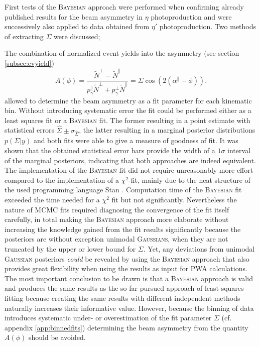 First tests of the \textsc{Bayesian} approach were performed when confirming already published results for the beam asymmetry in $\eta$ photoproduction \cite{farahphd,eta} and were successively also applied to data obtained from $\eta'$ photoproduction. Two methods of extracting $\Sigma$ were discussed;

The combination of normalized event yields into the asymmetry (see section \ref{subsec:evyield})
	\begin{equation}
		A(\phi)=\frac{\tilde{N}^\bot-\tilde{N}^\parallel}{p_\gamma^\parallel\tilde{N}^\bot+p_\gamma^\bot\tilde{N}^\parallel}=\Sigma\cos\left(2\left(\alpha^\parallel-\phi\right)\right).
	\end{equation} 
allowed to determine the beam asymmetry as a fit parameter for each kinematic bin. Without introducing systematic error the fit could be performed either as a least squares fit or a \textsc{Bayesian} fit. The former resulting in a point estimate with statistical errors $\hat{\Sigma}\pm\sigma_{\hat{\Sigma}}$, the latter resulting in a marginal posterior distributions $p\left(\Sigma|y\right)$ and both fits were able to give a measure of goodness of fit. It was shown that the obtained statistical error bars provide the width of a $1\sigma$ interval of the 
marginal posteriors, indicating that both approaches are indeed equivalent. The implementation of the \textsc{Bayesian} fit did not require unreasonably more effort compared to the implementation of a $\chi^2$-fit, mainly due to the neat structure of the used programming language Stan \cite{stan}. Computation time of the \textsc{Bayesian} fit exceeded the time needed for a $\chi^2$ fit but not significantly. Nevertheless the nature of MCMC fits required diagnosing the convergence of the fit itself carefully, in total making the \textsc{Bayesian} approach more elaborate without increasing the knowledge gained from the fit results significantly because the posteriors are without exception unimodal \textsc{Gaussians}, when they are not truncated by the upper or lower bound for $\Sigma$. Yet, any deviations from unimodal \textsc{Gaussian} posteriors \emph{could} be revealed by using the \textsc{Bayesian} approach that also provides great flexibility when using the results as input for PWA calculations. The most important conclusion to be drawn is that a \textsc{Bayesian} approach is valid and produces the same results as the so far pursued approach of least-squares fitting because creating the same results with different independent methods naturally increases their informative value. However, because the binning of data introduces systematic under- or overestimation of the fit parameter $\Sigma$ (cf. appendix \ref{app:binnedfits}) determining the beam asymmetry from the quantity $A\left(\phi\right)$ should be avoided.

